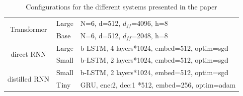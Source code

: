 \documentclass[11pt,a4paper]{article}
\begin{document}


\begin{table}[]
\centering\small
\begin{tabular}{cll}
\hline
\multirow{2}{*}{Transformer}   & Large          & N=6, d=512, \(d_{ff}\)=4096, h=8                    \\ \cline{2-3}
                               & Base         & N=6, d=512, \(d_{ff}\)=2048, h=8                    \\ \hline
\multirow{2}{*}{direct RNN}     & Large & b-LSTM, 4 layers*1024, embed=512, optim=sgd    \\ \cline{2-3}
                               & Small & b-LSTM, 2 layers*1024, embed=512, optim=sgd    \\ \hline
\multirow{2}{*}{distilled RNN} & Small          & b-LSTM, 2 layers*1024, embed=512, optim=sgd    \\ \cline{2-3}
                               & Tiny           & GRU, enc:2, dec:1 *512, embed=256, optim=adam \\ \hline
\end{tabular}
\caption{\small Configurations for the different systems presented in the paper}
\label{table:config}
\end{table}
\end{document}
